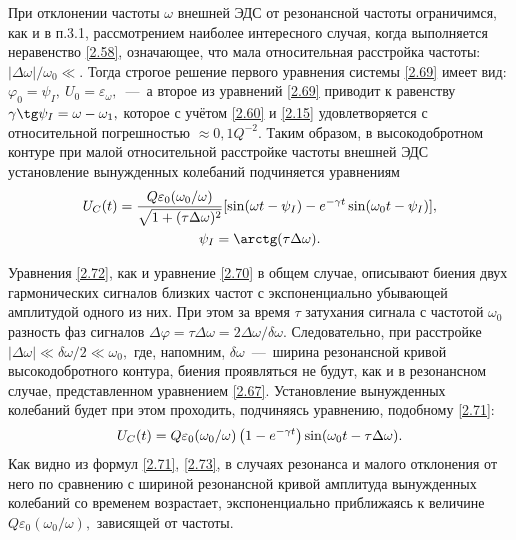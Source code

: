 При отклонении частоты $\omega$ внешней ЭДС от резонансной частоты   ограничимся, как и в п.3.1, рассмотрением наиболее интересного случая, когда выполняется неравенство \eqref{2.58}, означающее, что мала относительная расстройка частоты: $|\Delta\omega|/\omega_0\ll.$ Тогда строгое решение первого уравнения системы \eqref{2.69} имеет вид: $\varphi_0=\psi_I,~U_0=\varepsilon_{\omega},$~---~а второе из уравнений \eqref{2.69} приводит к равенству $\gamma\tg\psi_I=\omega-\omega_1,$ которое с учётом \eqref{2.60} и \eqref{2.15} удовлетворяется с относительной погрешностью $\approx0,1Q^{-2}.$ Таким образом, в высокодобротном контуре при малой относительной расстройке частоты внешней ЭДС установление вынужденных колебаний подчиняется уравнениям
\begin{equation}
	\eqmark{2.72}
	\begin{gathered}[c]
		U_C(t)=\dfrac{Q\varepsilon_0(\omega_0/\omega)}{\sqrt{1+(\tau\Delta\omega)^2}}[\sin(\omega t-\psi_I)-e^{-\gamma t}\sin(\omega_0t-\psi_I)],\\
		\psi_I=\arctg(\tau\Delta\omega).
	\end{gathered}
\end{equation}

Уравнения \eqref{2.72}, как и уравнение \eqref{2.70} в общем случае, описывают биения двух гармонических сигналов близких частот с экспоненциально убывающей амплитудой одного из них. При этом за время $\tau$ затухания сигнала с частотой $\omega_0$ разность фаз сигналов $\Delta\varphi=\tau\Delta\omega=2\Delta\omega/\delta\omega.$ Следовательно, при расстройке $|\Delta\omega|\ll\delta\omega/2\ll\omega_0,$ где, напомним, $\delta\omega$~---~ширина резонансной кривой высокодобротного контура, биения проявляться не будут, как и в резонансном случае, представленном уравнением \eqref{2.67}. Установление вынужденных колебаний будет при этом проходить, подчиняясь уравнению, подобному \eqref{2.71}:
\begin{equation}\eqmark{2.73}
	U_C(t)=Q\varepsilon_0(\omega_0/\omega)\left(1-e^{-\gamma t}\right)\sin(\omega_0t-\tau\Delta\omega).
\end{equation}
Как видно из формул \eqref{2.71}, \eqref{2.73}, в случаях резонанса и малого отклонения от него по сравнению с шириной резонансной кривой амплитуда вынужденных колебаний со временем возрастает, экспоненциально приближаясь к величине \\$Q\varepsilon_0(\omega_0/\omega),$ зависящей от частоты. 

